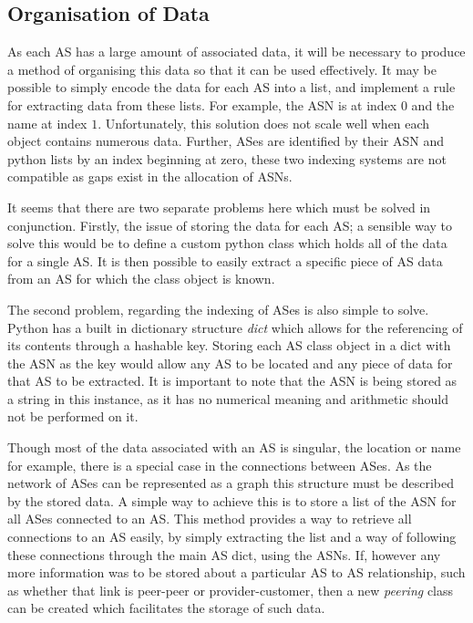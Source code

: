 \subsection{Organisation of Data}
As each AS has a large amount of associated data, it will be necessary to produce a method of organising this data so that it can be used effectively. It may be possible to simply encode the data for each AS into a list, and implement a rule for extracting data from these lists. For example, the ASN is at index $0$ and the name at index $1$. Unfortunately, this solution does not scale well when each object contains numerous data. Further, ASes are identified by their ASN and python lists by an index beginning at zero, these two indexing systems are not compatible as gaps exist in the allocation of ASNs. 

It seems that there are two separate problems here which must be solved in conjunction. Firstly, the issue of storing the data for each AS; a sensible way to solve this would be to define a custom python class which holds all of the data for a single AS. It is then possible to easily extract a specific piece of AS data from an AS for which the class object is known. 

The second problem, regarding the indexing of ASes is also simple to solve. Python has a built in dictionary structure \textit{dict} which allows for the referencing of its contents through a hashable key. Storing each AS class object in a dict with the ASN as the key would allow any AS to be located and any piece of data for that AS to be extracted. It is important to note that the ASN is being stored as a string in this instance, as it has no numerical meaning and arithmetic should not be performed on it. 

Though most of the data associated with an AS is singular, the location or name for example, there is a special case in the connections between ASes. As the network of ASes can be represented as a graph this structure must be described by the stored data. A simple way to achieve this is to store a list of the ASN for all ASes connected to an AS. This method provides a way to retrieve all connections to an AS easily, by simply extracting the list and a way of following these connections through the main AS dict, using the ASNs. If, however any more information was to be stored about a particular AS to AS relationship, such as whether that link is peer-peer or provider-customer, then a new \textit{peering} class can be created which facilitates the storage of such data. 


